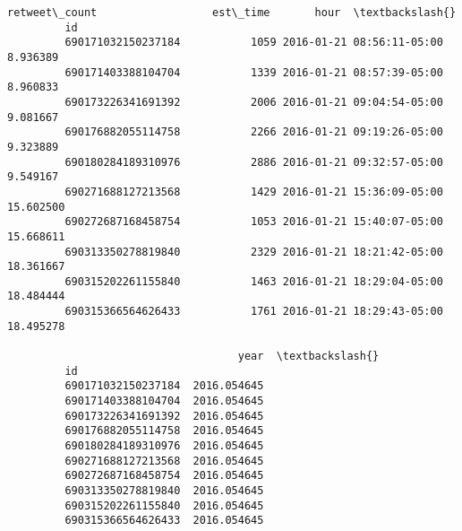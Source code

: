 \documentclass[11pt]{article}
\begin{document}
\begin{Verbatim}[commandchars=\\\{\}]
                             retweet\_count                  est\_time       hour  \textbackslash{}
         id                                                                       
         690171032150237184           1059 2016-01-21 08:56:11-05:00   8.936389   
         690171403388104704           1339 2016-01-21 08:57:39-05:00   8.960833   
         690173226341691392           2006 2016-01-21 09:04:54-05:00   9.081667   
         690176882055114758           2266 2016-01-21 09:19:26-05:00   9.323889   
         690180284189310976           2886 2016-01-21 09:32:57-05:00   9.549167   
         690271688127213568           1429 2016-01-21 15:36:09-05:00  15.602500   
         690272687168458754           1053 2016-01-21 15:40:07-05:00  15.668611   
         690313350278819840           2329 2016-01-21 18:21:42-05:00  18.361667   
         690315202261155840           1463 2016-01-21 18:29:04-05:00  18.484444   
         690315366564626433           1761 2016-01-21 18:29:43-05:00  18.495278   
         
                                    year  \textbackslash{}
         id                                
         690171032150237184  2016.054645   
         690171403388104704  2016.054645   
         690173226341691392  2016.054645   
         690176882055114758  2016.054645   
         690180284189310976  2016.054645   
         690271688127213568  2016.054645   
         690272687168458754  2016.054645   
         690313350278819840  2016.054645   
         690315202261155840  2016.054645   
         690315366564626433  2016.054645   
         

\end{Verbatim}
\end{document}

